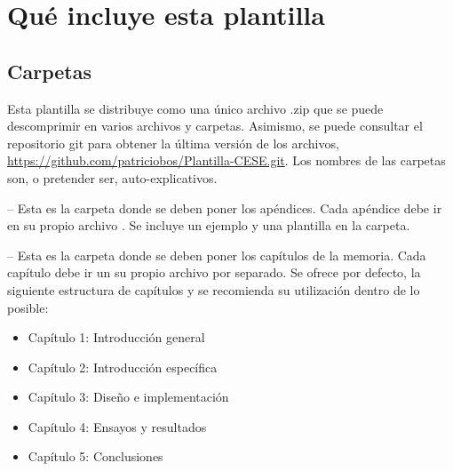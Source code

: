 





\section{Qué incluye esta plantilla}

\subsection{Carpetas}

Esta plantilla se distribuye como una único archivo .zip que se puede descomprimir en varios archivos y carpetas. Asimismo, se puede consultar el repositorio git para obtener la última versión de los archivos, \url{https://github.com/patriciobos/Plantilla-CESE.git}. Los nombres de las carpetas son, o pretender ser, auto-explicativos.

 -- Esta es la carpeta donde se deben poner los apéndices. Cada apéndice debe ir en su propio archivo . Se incluye un ejemplo y una plantilla en la carpeta.

 -- Esta es la carpeta donde se deben poner los capítulos de la memoria. Cada capítulo debe ir un su propio archivo  por separado.  Se ofrece por defecto, la siguiente estructura de capítulos y se recomienda su utilización dentro de lo posible:

\begin{itemize}
\item Capítulo 1: Introducción general	
\item Capítulo 2: Introducción específica
\item Capítulo 3: Diseño e implementación
\item Capítulo 4: Ensayos y resultados
\item Capítulo 5: Conclusiones

\end{itemize}


